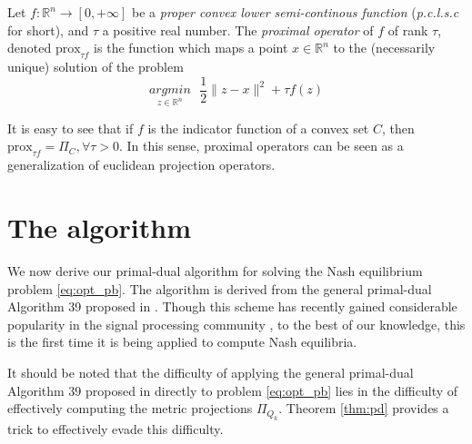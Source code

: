 \documentclass{article} %
\begin{document}
Let $f : \mathbb{R}^n \rightarrow [0, +\infty]$ be a \textit{proper convex lower semi-continous function}
(\textit{p.c.l.s.c} for short), and $\tau$ a positive real number. The \textit{proximal operator} of $f$ of rank
$\tau$, denoted $\text{prox}_{\tau f}$ is the function which maps a point $x \in \mathbb{R}^n$ to the (necessarily
unique) solution of the problem
\begin{equation}
  \underset{z \in \mathbb{R}^n}{argmin}\text{ }\frac{1}{2}\|z - x\|^2 + \tau f(z)
\end{equation}

It is easy to see that if $f$ is the indicator function of a convex set $C$, then $\text{prox}_{\tau f} = \Pi_C, \forall \tau > 0$. In this sense, proximal operators can be seen
as a generalization of euclidean projection operators.

\section{The algorithm}
\label{sec:algo}
We now derive our primal-dual algorithm for solving the Nash equilibrium problem \eqref{eq:opt_pb}. The algorithm is derived from the general primal-dual Algorithm 39 proposed in \cite{chambolle2010}. Though this scheme has recently gained considerable popularity in the signal processing community
, to the best of our knowledge, this is the first time it is being applied to compute Nash equilibria.

It should be noted that the difficulty of applying the general primal-dual Algorithm 39 proposed in \cite{chambolle2010} directly to problem \eqref{eq:opt_pb} lies in the difficulty of effectively computing the metric projections $\Pi_{Q_k}$. Theorem \ref{thm:pd} provides a trick to effectively evade this difficulty.
\end{document}
